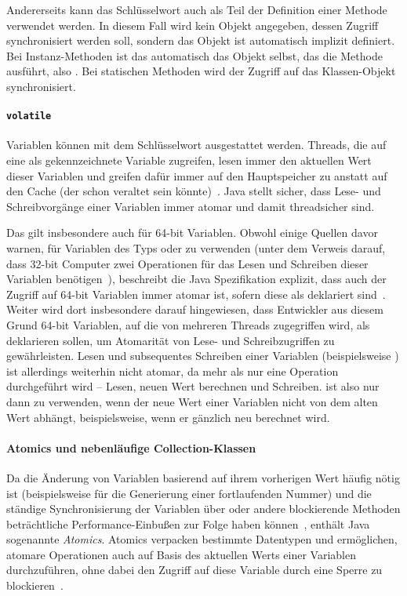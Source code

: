 Andererseits kann das Schlüsselwort  auch als Teil der Definition einer Methode verwendet werden. In diesem Fall wird kein Objekt angegeben, dessen Zugriff synchronisiert werden soll, sondern das Objekt ist automatisch implizit definiert. Bei Instanz-Methoden ist das automatisch das Objekt selbst, das die Methode ausführt, also . Bei statischen Methoden wird der Zugriff auf das Klassen-Objekt synchronisiert.

\paragraph{\texttt{volatile}} Variablen können mit dem Schlüsselwort  ausgestattet werden. Threads, die auf eine als  gekennzeichnete Variable zugreifen, lesen immer den aktuellen Wert dieser Variablen und greifen dafür immer auf den Hauptspeicher zu anstatt auf den Cache (der schon veraltet sein könnte)~\cite[S.~30~\psqq]{Friesen2015}. Java stellt sicher, dass Lese- und Schreibvorgänge einer  Variablen immer atomar und damit threadsicher sind.

Das gilt insbesondere auch für 64-bit Variablen. Obwohl einige Quellen davor warnen,  für Variablen des Typs  oder  zu verwenden (unter dem Verweis darauf, dass 32-bit Computer zwei Operationen für das Lesen und Schreiben dieser Variablen benötigen~\cite[S.~34]{Friesen2015}), beschreibt die Java Spezifikation explizit, dass auch der Zugriff auf 64-bit Variablen immer atomar ist, sofern diese als  deklariert sind~\cite{Java7Spec17}. Weiter wird dort insbesondere darauf hingewiesen, dass Entwickler aus diesem Grund 64-bit Variablen, auf die von mehreren Threads zugegriffen wird, als  deklarieren sollen, um Atomarität von Lese- und Schreibzugriffen zu gewährleisten. Lesen und subsequentes Schreiben einer  Variablen (beispielsweise ) ist allerdings weiterhin nicht atomar, da mehr als nur eine Operation durchgeführt wird -- Lesen, neuen Wert berechnen und Schreiben.  ist also nur dann zu verwenden, wenn der neue Wert einer Variablen nicht von dem alten Wert abhängt, beispielsweise, wenn er gänzlich neu berechnet wird.

\paragraph{Atomics und nebenläufige Collection-Klassen} Da die Änderung von Variablen basierend auf ihrem vorherigen Wert häufig nötig ist (beispielsweise für die Generierung einer fortlaufenden Nummer) und die ständige Synchronisierung der Variablen über  oder andere blockierende Methoden beträchtliche Performance-Einbußen zur Folge haben können~\cite[S.~130]{Friesen2015}, enthält Java sogenannte \emph{Atomics}. Atomics verpacken bestimmte Datentypen und ermöglichen, atomare Operationen auch auf Basis des aktuellen Werts einer Variablen durchzuführen, ohne dabei den Zugriff auf diese Variable durch eine Sperre zu blockieren~\cite[S.~130]{Friesen2015}. 


